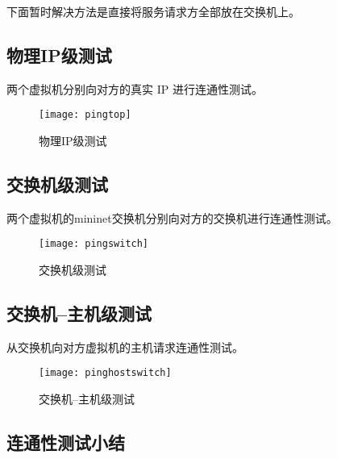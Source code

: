     下面暂时解决方法是直接将服务请求方全部放在交换机上。

    \subsection{物理IP级测试}

    两个虚拟机分别向对方的真实 IP 进行连通性测试。

    \begin{figure}[H]
        \centering
        \texttt{[image: pingtop]}
        \caption{物理IP级测试}\label{fig:pingtop}
    \end{figure}

    \subsection{交换机级测试}

    两个虚拟机的mininet交换机分别向对方的交换机进行连通性测试。

    \begin{figure}[H]
        \centering
        \texttt{[image: pingswitch]}
        \caption{交换机级测试}\label{fig:pingswitch}
    \end{figure}

    \subsection{交换机--主机级测试}

    从交换机向对方虚拟机的主机请求连通性测试。

    \begin{figure}[H]
        \centering
        \texttt{[image: pinghostswitch]}
        \caption{交换机--主机级测试}\label{fig:pinghostswitch}
    \end{figure}

    \subsection{连通性测试小结}

